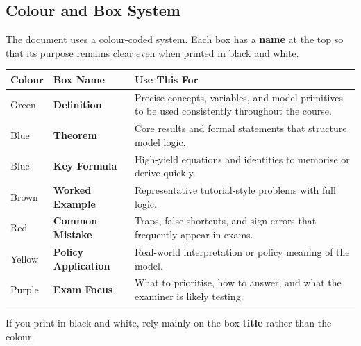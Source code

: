 \documentclass[12pt]{article}
\begin{document}
\subsection*{Colour and Box System}

The document uses a colour-coded system. Each box has a \textbf{name} at the top so that its purpose remains clear even when printed in black and white.

\begin{center}
\begin{tabular}{|l|l|p{7cm}|}
\hline
\textbf{Colour} & \textbf{Box Name} & \textbf{Use This For} \\
\hline
\colorbox{green!5}{Green} & \textbf{Definition} & Precise concepts, variables, and model primitives to be used consistently throughout the course. \\
\hline
\colorbox{blue!3}{Blue} & \textbf{Theorem} & Core results and formal statements that structure model logic. \\
\hline
\colorbox{blue!5}{Blue} & \textbf{Key Formula} & High-yield equations and identities to memorise or derive quickly. \\
\hline
\colorbox{brown!5}{Brown} & \textbf{Worked Example} & Representative tutorial-style problems with full logic. \\
\hline
\colorbox{red!5}{Red} & \textbf{Common Mistake} & Traps, false shortcuts, and sign errors that frequently appear in exams. \\
\hline
\colorbox{yellow!10}{Yellow} & \textbf{Policy Application} & Real-world interpretation or policy meaning of the model. \\
\hline
\colorbox{purple!5}{Purple} & \textbf{Exam Focus} & What to prioritise, how to answer, and what the examiner is likely testing. \\
\hline
\end{tabular}
\end{center}

\noindent
If you print in black and white, rely mainly on the box \textbf{title} rather than the colour.




\newpage




\newpage


\newpage

\end{document}
